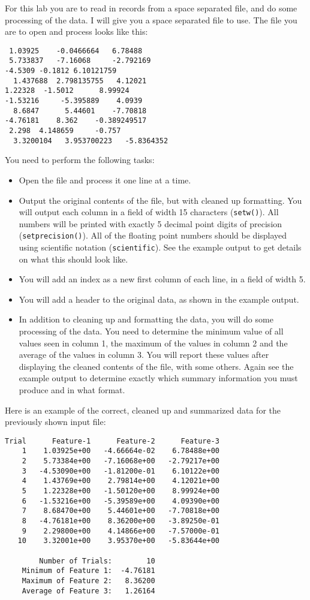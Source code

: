 \documentclass[11pt]{article}
\begin{document}
For this lab you are to read in records from a space separated file, and
do some processing of the data.  I will give you a space separated file
to use.  The file you are to open and process looks like this:

\begin{verbatim}
 1.03925	-0.0466664	 6.78488	
 5.733837	-7.16068	 -2.792169	
-4.5309	-0.1812	6.10121759	
  1.437688	2.798135755	  4.12021	
1.22328	 -1.5012	  8.99924	
-1.53216	 -5.395889	  4.0939	
  8.6847	  5.44601	 -7.70818	
-4.76181	8.362	 -0.389249517	
 2.298	4.148659	 -0.757	
  3.3200104	  3.953700223	-5.8364352
\end{verbatim}

You need to perform the following tasks:

\begin{itemize}
\item Open the file and process it one line at a time.
\item Output the original contents of the file, but with cleaned up
formatting.  You will output each column in a field of width 15
characters (\verb~setw()~).  All numbers will be printed with exactly 5
decimal point digits of precision (\verb~setprecision()~).  All of the
floating point numbers should be displayed using scientific notation
(\verb~scientific~).  See the example output to get details on what
this should look like.
\item You will add an index as a new first column of each line, in a field
of width 5.
\item You will add a header to the original data, as shown in the example
output.
\item In addition to cleaning up and formatting the data, you will do some
processing of the data.  You need to determine the minimum value of
all values seen in column 1, the maximum of the values in column 2
and the average of the values in column 3.  You will report these
values after displaying the cleaned contents of the file, with some
others.  Again see the example output to determine exactly which
summary information you must produce and in what format.
\end{itemize}

Here is an example of the correct, cleaned up and summarized data for
the previously shown input file:

\begin{verbatim}
Trial      Feature-1      Feature-2      Feature-3
    1    1.03925e+00   -4.66664e-02    6.78488e+00
    2    5.73384e+00   -7.16068e+00   -2.79217e+00
    3   -4.53090e+00   -1.81200e-01    6.10122e+00
    4    1.43769e+00    2.79814e+00    4.12021e+00
    5    1.22328e+00   -1.50120e+00    8.99924e+00
    6   -1.53216e+00   -5.39589e+00    4.09390e+00
    7    8.68470e+00    5.44601e+00   -7.70818e+00
    8   -4.76181e+00    8.36200e+00   -3.89250e-01
    9    2.29800e+00    4.14866e+00   -7.57000e-01
   10    3.32001e+00    3.95370e+00   -5.83644e+00

        Number of Trials:        10
    Minimum of Feature 1:  -4.76181
    Maximum of Feature 2:   8.36200
    Average of Feature 3:   1.26164
\end{verbatim}
\end{document}
